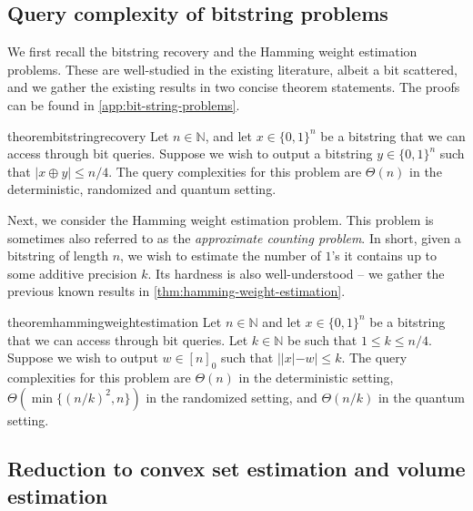 \documentclass[11pt]{article}
\newcommand{\N}{\ensuremath{\mathbb{N}}}
\begin{document}
    \subsection{Query complexity of bitstring problems}
    \label{subsec:bit-string-problems}

    We first recall the bitstring recovery and the Hamming weight estimation problems. These are well-studied in the existing literature, albeit a bit scattered, and we gather the existing results in two concise theorem statements. The proofs can be found in \cref{app:bit-string-problems}.

    \begin{restatable}{theorem}{bitstringrecovery}
        \label{thm:bit-string-recovery}
        Let $n \in \N$, and let $x \in \{0,1\}^n$ be a bitstring that we can access through bit queries. Suppose we wish to output a bitstring $y \in \{0,1\}^n$ such that $|x \oplus y| \leq n/4$. The query complexities for this problem are $\Theta(n)$ in the deterministic, randomized and quantum setting.
    \end{restatable}

    Next, we consider the Hamming weight estimation problem. This problem is sometimes also referred to as the \textit{approximate counting problem}. In short, given a bitstring of length $n$, we wish to estimate the number of $1$'s it contains up to some additive precision $k$. Its hardness is also well-understood -- we gather the previous known results in \cref{thm:hamming-weight-estimation}.

    \begin{restatable}{theorem}{hammingweightestimation}
        \label{thm:hamming-weight-estimation}
        Let $n \in \N$ and let $x \in \{0,1\}^n$ be a bitstring that we can access through bit queries. Let $k \in \N$ be such that $1 \leq k \leq n/4$. Suppose we wish to output $w \in [n]_0$ such that $||x| - w| \leq k$. The query complexities for this problem are $\Theta(n)$ in the deterministic setting, $\Theta(\min\{(n/k)^2,n\})$ in the randomized setting, and $\Theta(n/k)$ in the quantum setting.
    \end{restatable}

    \subsection{Reduction to convex set estimation and volume estimation}
    \label{subsec:reductions}
\end{document}

